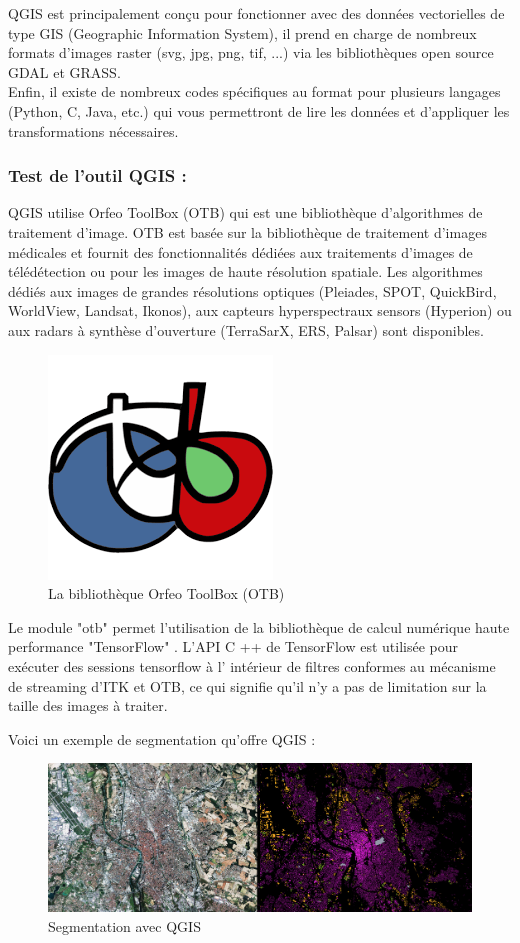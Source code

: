 \documentclass[12pt, openany]{report}
\begin{document}
QGIS est principalement conçu pour fonctionner avec des données vectorielles de type GIS (Geographic Information System), il prend en charge de nombreux formats d'images raster (svg, jpg, png, tif, ...) via les bibliothèques open source GDAL et GRASS.\\

Enfin, il existe de nombreux codes spécifiques au format pour plusieurs langages (Python, C, Java, etc.) qui vous permettront de lire les données et d'appliquer les transformations nécessaires.\\

\newpage
\subsubsection{Test de l'outil QGIS :}
QGIS utilise Orfeo ToolBox (OTB) qui est une bibliothèque d’algorithmes de traitement d’image. OTB est basée sur la bibliothèque de traitement d’images médicales et fournit des fonctionnalités dédiées aux traitements d’images de télédétection ou pour les images de haute résolution spatiale. Les algorithmes dédiés aux images de grandes résolutions optiques (Pleiades, SPOT, QuickBird, WorldView, Landsat, Ikonos), aux capteurs hyperspectraux sensors (Hyperion) ou aux radars à synthèse d’ouverture (TerraSarX, ERS, Palsar) sont disponibles.
\begin{figure}[ht]
\centering
\includegraphics[scale=0.5]{orfeo.png}
\caption{La bibliothèque Orfeo ToolBox (OTB)}
\end{figure}

Le module "otb" permet l'utilisation de la bibliothèque de calcul numérique haute performance "TensorFlow" . L'API C ++ de TensorFlow est utilisée pour exécuter des sessions tensorflow à l' intérieur de filtres conformes au mécanisme de streaming d'ITK et OTB, ce qui signifie qu'il n'y a pas de limitation sur la taille des images à traiter.


Voici un exemple de segmentation qu'offre QGIS :
\begin{figure}[ht]
\centering
\noindent
\includegraphics[width=1.1\textwidth]{test_segmentation.png}
\caption{Segmentation avec QGIS}
\end{figure}
\end{document}

